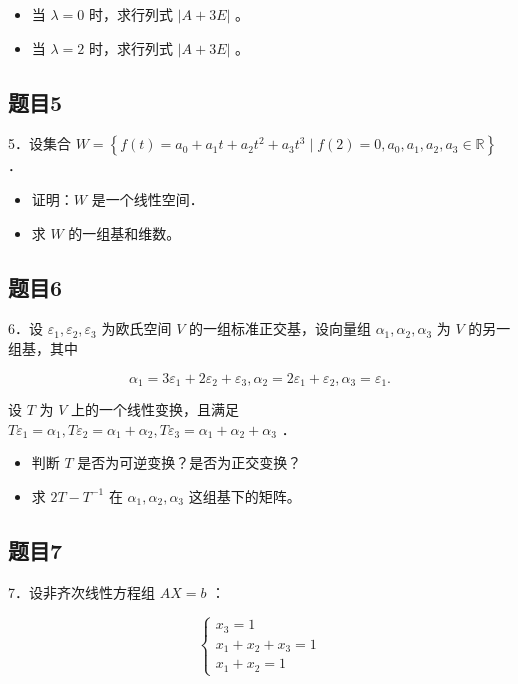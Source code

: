 \documentclass{article}
\begin{document}
\begin{itemize}
  \item[（1）] 当 \(\lambda=0\) 时，求行列式 \(|A+3 E|\) 。
  \item[（2）] 当 \(\lambda=2\) 时，求行列式 \(|A+3 E|\) 。
\end{itemize}

\subsection{题目5}
5．设集合 \(W=\left\{f(t)=a_{0}+a_{1} t+a_{2} t^{2}+a_{3} t^{3} \mid f(2)=0, a_{0}, a_{1}, a_{2}, a_{3} \in \mathbb{R}\right\}\) ．

\begin{itemize}
  \item[（1）] 证明：\(W\) 是一个线性空间．
  \item[（2）] 求 \(W\) 的一组基和维数。
\end{itemize}

\subsection{题目6}
6．设 \(\varepsilon_{1}, \varepsilon_{2}, \varepsilon_{3}\) 为欧氏空间 \(V\) 的一组标准正交基，设向量组 \(\alpha_{1}, \alpha_{2}, \alpha_{3}\) 为 \(V\) 的另一组基，其中

\[
\alpha_{1}=3 \varepsilon_{1}+2 \varepsilon_{2}+\varepsilon_{3}, \alpha_{2}=2 \varepsilon_{1}+\varepsilon_{2}, \alpha_{3}=\varepsilon_{1} .
\]

设 \(T\) 为 \(V\) 上的一个线性变换，且满足 \(T \varepsilon_{1}=\alpha_{1}, T \varepsilon_{2}=\alpha_{1}+\alpha_{2}, T \varepsilon_{3}=\alpha_{1}+\alpha_{2}+\alpha_{3}\) ．

\begin{itemize}
  \item[（1）] 判断 \(T\) 是否为可逆变换？是否为正交变换？
  \item[（2）] 求 \(2 T-T^{-1}\) 在 \(\alpha_{1}, \alpha_{2}, \alpha_{3}\) 这组基下的矩阵。
\end{itemize}

\subsection{题目7}
7．设非齐次线性方程组 \(A X=b\) ：

\[
\left\{\begin{array}{l}
x_{3}=1 \\
x_{1}+x_{2}+x_{3}=1 \\
x_{1}+x_{2}=1
\end{array}\right.
\]
\end{document}
